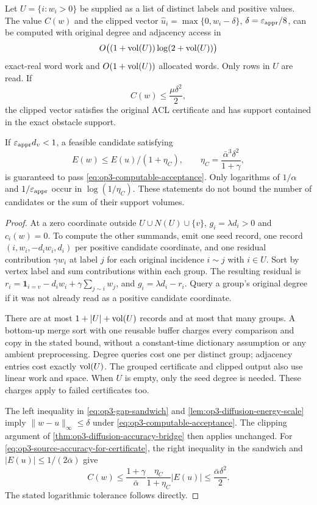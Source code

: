 \begin{theorem}
\label{thm:op3-local-gap-certificate}
Let $U=\{i:w_i>0\}$ be supplied as a list of distinct labels and positive
values. The value $C(w)$ and the clipped vector
$\widehat u_i=\max\{0,w_i-\delta\}$, $\delta=\varepsilon_{\mathrm{appr}}/8$, can be computed
with original degree and adjacency access in
\[
 O\bigl((1+\operatorname{vol}(U))\log(2+\operatorname{vol}(U))\bigr)
\]
exact-real word work and $O(1+\operatorname{vol}(U))$ allocated words. Only rows in
$U$ are read. If
\begin{equation}
 C(w)\leq\frac{\mu\delta^2}{2},
 \label{eq:op3-computable-acceptance}
\end{equation}
the clipped vector satisfies the original ACL certificate and has support
contained in the exact obstacle support.

If $\varepsilon_{\mathrm{appr}} d_v<1$, a feasible candidate satisfying
\begin{equation}
 E(w)\leq E(u)/(1+\eta_C),\qquad
 \eta_C=\frac{\bar\alpha^3\delta^2}{1+\gamma},
 \label{eq:op3-source-accuracy-for-certificate}
\end{equation}
is guaranteed to pass \cref{eq:op3-computable-acceptance}.
Only logarithms of $1/\alpha$ and $1/\varepsilon_{\mathrm{appr}}$ occur in
$\log(1/\eta_C)$. These statements do not bound the number of candidates
or the sum of their support volumes.
\end{theorem}
\begin{proof}
At a zero coordinate outside $U\cup N(U)\cup\{v\}$,
$g_i=\lambda d_i>0$ and $c_i(w)=0$. To compute the other summands, emit
one seed record, one record $(i,w_i,-d_iw_i,d_i)$ per positive candidate
coordinate, and one residual contribution $\gamma w_i$ at label $j$ for
each original incidence $i\sim j$ with $i\in U$. Sort by vertex label
and sum contributions within each group. The resulting residual is
$r_i=\mathbf1_{i=v}-d_iw_i+\gamma\sum_{j\sim i}w_j$, and
$g_i=\lambda d_i-r_i$. Query a group's original degree if it was not
already read as a positive candidate coordinate.

There are at most $1+|U|+\operatorname{vol}(U)$ records and at most that many groups.
A bottom-up merge sort with one reusable buffer charges every comparison
and copy in the stated bound, without a constant-time dictionary assumption
or any ambient preprocessing. Degree queries cost one per distinct group;
adjacency entries cost exactly $\operatorname{vol}(U)$. The grouped certificate and
clipped output also use linear work and space. When $U$ is empty, only
the seed degree is needed. These charges apply to failed certificates too.

The left inequality in \cref{eq:op3-gap-sandwich} and
\cref{lem:op3-diffusion-energy-scale} imply $\|w-u\|_\infty\leq\delta$
under \cref{eq:op3-computable-acceptance}. The clipping argument of
\cref{thm:op3-diffusion-accuracy-bridge} then applies unchanged.
For \cref{eq:op3-source-accuracy-for-certificate}, the right inequality
in the sandwich and $|E(u)|\leq1/(2\bar\alpha)$ give
\[
 C(w)\leq\frac{1+\gamma}{\bar\alpha}
       \frac{\eta_C}{1+\eta_C}|E(u)|
 \leq\frac{\bar\alpha\delta^2}{2}.
\]
The stated logarithmic tolerance follows directly.
\end{proof}

